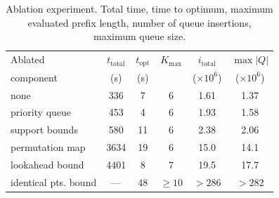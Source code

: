 \begin{table}[t]
\centering
\begin{tabular}{l | c | c | c | c | c}
Ablated & $t_\text{total}$ & $t_\text{opt}$ & $K_\text{max}$ & $i_\text{total}$ & $\max | Q |$ \\
component & (s) & (s) & & ($\times 10^6$) & ($\times 10^6$) \\
\hline
none & 336 & 7 & 6 & 1.61 & 1.37 \\
priority queue & 453 & 4 & 6 & 1.93 & 1.58 \\
support bounds & 580 & 11 & 6 & 2.38 & 2.06 \\
permutation map & 3634 & 19 & 6 & 15.0 & 14.1 \\
lookahead bound & 4401 & 8 & 7 & 19.5 & 17.7 \\
identical pts. bound & --- & 48 & $\ge 10$ & $>286$ & $>282$ \\
\end{tabular}
\vspace{2mm}
\caption{Ablation experiment.
Total time, time to optimum, maximum evaluated prefix length,
number of queue insertions, maximum queue size.}
\label{tab:ablation}
\end{table}

